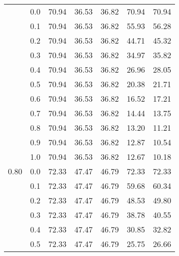 \begin{longtable}{lp{2cm}|p{2cm}p{2cm}p{2cm}p{2cm}p{2cm}}
\bottomrule
\endlastfoot
0.70 & 0.0 &       70.94 &             36.53 &                36.82 &                70.94 &           70.94 \\
     & 0.1 &       70.94 &             36.53 &                36.82 &                55.93 &           56.28 \\
     & 0.2 &       70.94 &             36.53 &                36.82 &                44.71 &           45.32 \\
     & 0.3 &       70.94 &             36.53 &                36.82 &                34.97 &           35.82 \\
     & 0.4 &       70.94 &             36.53 &                36.82 &                26.96 &           28.05 \\
     & 0.5 &       70.94 &             36.53 &                36.82 &                20.38 &           21.71 \\
     & 0.6 &       70.94 &             36.53 &                36.82 &                16.52 &           17.21 \\
     & 0.7 &       70.94 &             36.53 &                36.82 &                14.44 &           13.75 \\
     & 0.8 &       70.94 &             36.53 &                36.82 &                13.20 &           11.21 \\
     & 0.9 &       70.94 &             36.53 &                36.82 &                12.87 &           10.54 \\
     & 1.0 &       70.94 &             36.53 &                36.82 &                12.67 &           10.18 \\
0.80 & 0.0 &       72.33 &             47.47 &                46.79 &                72.33 &           72.33 \\
     & 0.1 &       72.33 &             47.47 &                46.79 &                59.68 &           60.34 \\
     & 0.2 &       72.33 &             47.47 &                46.79 &                48.53 &           49.80 \\
     & 0.3 &       72.33 &             47.47 &                46.79 &                38.78 &           40.55 \\
     & 0.4 &       72.33 &             47.47 &                46.79 &                30.85 &           32.82 \\
     & 0.5 &       72.33 &             47.47 &                46.79 &                25.75 &           26.66 \\

\end{longtable}
